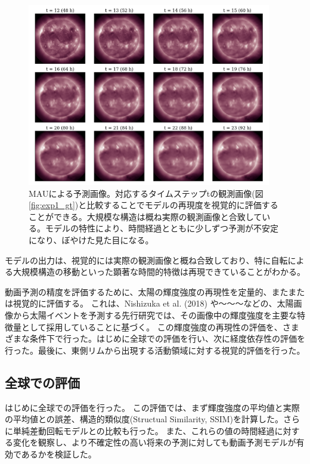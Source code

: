     \begin{figure}[htpb]
      \centering
      \includegraphics[width=0.95\textwidth]{figures/exp1/pd.png}
      \caption{MAUによる予測画像。対応するタイムステップtの観測画像(図\ref{fig:exp1_gt})と比較することでモデルの再現度を視覚的に評価することができる。大規模な構造は概ね実際の観測画像と合致している。モデルの特性により、時間経過とともに少しずつ予測が不安定になり、ぼやけた見た目になる。}
      \label{fig:exp1_pd}
    \end{figure}
    モデルの出力は、視覚的には実際の観測画像と概ね合致しており、特に自転による大規模構造の移動といった顕著な時間的特徴は再現できていることがわかる。

    動画予測の精度を評価するために、太陽の輝度強度の再現性を定量的、またまたは視覚的に評価する。
    これは、Nishizuka et al. (2018) \cite{nishizuka2018deep} や〜〜〜などの、太陽画像から太陽イベントを予測する先行研究では、その画像中の輝度強度を主要な特徴量として採用していることに基づく。
    この輝度強度の再現性の評価を、さまざまな条件下で行った。はじめに全球での評価を行い、次に経度依存性の評価を行った。最後に、東側リムから出現する活動領域に対する視覚的評価を行った。

    \subsection{全球での評価}
      はじめに全球での評価を行った。
      この評価では、まず輝度強度の平均値と実際の平均値との誤差、構造的類似度(Structual Similarity, SSIM)を計算した。さらに単純差動回転モデルとの比較も行った。
      また、これらの値の時間経過に対する変化を観察し、より不確定性の高い将来の予測に対しても動画予測モデルが有効であるかを検証した。
      
